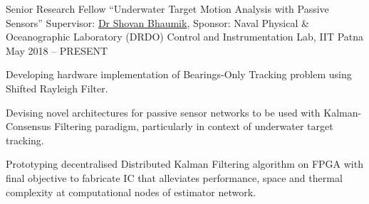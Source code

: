 
\begin{cvexperience}

\cvposition
	{Senior Research Fellow} %
	{``Underwater Target Motion Analysis with Passive Sensors''} %
	{Supervisor: \href{http://www.tutorialpoint.org/ShovanBhaumik/index.html}{Dr Shovan Bhaumik}, Sponsor: Naval Physical \& Oceanographic Laboratory (DRDO)} %
	{Control and Instrumentation Lab, IIT Patna} %
	{May 2018 -- PRESENT} %
	{\begin{cvitems} %
		\item {Developing hardware implementation of Bearings-Only Tracking problem using Shifted Rayleigh Filter.}
		\item {Devising novel architectures for passive sensor networks to be used with Kalman-Consensus Filtering paradigm, particularly in context of underwater target tracking.}
		\item {Prototyping decentralised Distributed Kalman Filtering algorithm on FPGA with final objective to fabricate IC that alleviates performance, space and thermal complexity at computational nodes of estimator network.}
	\end{cvitems}}


\end{cvexperience}
